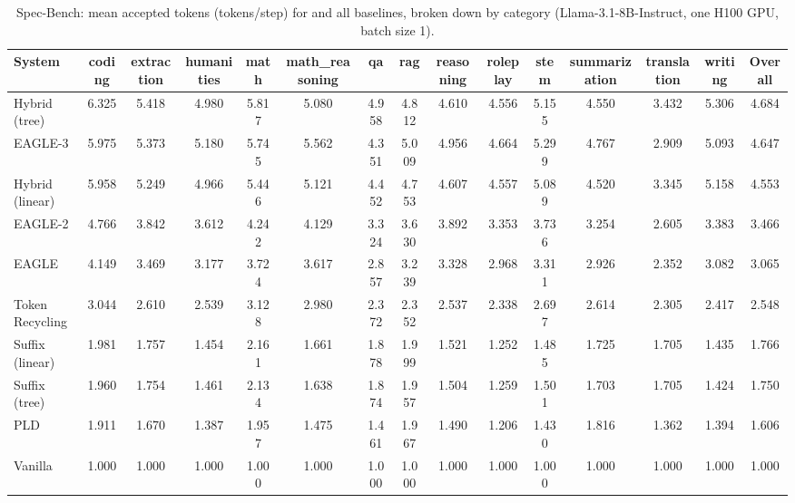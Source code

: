 \begin{table}[htbp]
\centering
\caption{Spec-Bench: mean accepted tokens (tokens/step) for \SuffixDecoding and all baselines, broken down by category (Llama-3.1-8B-Instruct, one H100 GPU, batch size 1).}
\label{suffixdecoding:tab:spec-mat}
\small
\begin{adjustbox}{width=\linewidth}
\begin{tabular}{lcccccccccccccc}
\toprule
\textbf{System} & coding & extraction & humanities & math & math\_reasoning & qa & rag & reasoning & roleplay & stem & summarization & translation & writing & \textbf{Overall} \\
\midrule
Hybrid (tree) & 6.325 & 5.418 & 4.980 & 5.817 & 5.080 & 4.958 & 4.812 & 4.610 & 4.556 & 5.155 & 4.550 & 3.432 & 5.306 & 4.684 \\
EAGLE-3 & 5.975 & 5.373 & 5.180 & 5.745 & 5.562 & 4.351 & 5.009 & 4.956 & 4.664 & 5.299 & 4.767 & 2.909 & 5.093 & 4.647 \\
Hybrid (linear) & 5.958 & 5.249 & 4.966 & 5.446 & 5.121 & 4.452 & 4.753 & 4.607 & 4.557 & 5.089 & 4.520 & 3.345 & 5.158 & 4.553 \\
EAGLE-2 & 4.766 & 3.842 & 3.612 & 4.242 & 4.129 & 3.324 & 3.630 & 3.892 & 3.353 & 3.736 & 3.254 & 2.605 & 3.383 & 3.466 \\
EAGLE & 4.149 & 3.469 & 3.177 & 3.724 & 3.617 & 2.857 & 3.239 & 3.328 & 2.968 & 3.311 & 2.926 & 2.352 & 3.082 & 3.065 \\
Token Recycling & 3.044 & 2.610 & 2.539 & 3.128 & 2.980 & 2.372 & 2.352 & 2.537 & 2.338 & 2.697 & 2.614 & 2.305 & 2.417 & 2.548 \\
Suffix (linear) & 1.981 & 1.757 & 1.454 & 2.161 & 1.661 & 1.878 & 1.999 & 1.521 & 1.252 & 1.485 & 1.725 & 1.705 & 1.435 & 1.766 \\
Suffix (tree) & 1.960 & 1.754 & 1.461 & 2.134 & 1.638 & 1.874 & 1.957 & 1.504 & 1.259 & 1.501 & 1.703 & 1.705 & 1.424 & 1.750 \\
PLD & 1.911 & 1.670 & 1.387 & 1.957 & 1.475 & 1.461 & 1.967 & 1.490 & 1.206 & 1.430 & 1.816 & 1.362 & 1.394 & 1.606 \\
Vanilla & 1.000 & 1.000 & 1.000 & 1.000 & 1.000 & 1.000 & 1.000 & 1.000 & 1.000 & 1.000 & 1.000 & 1.000 & 1.000 & 1.000 \\
\bottomrule
\end{tabular}
\end{adjustbox}
\end{table}

